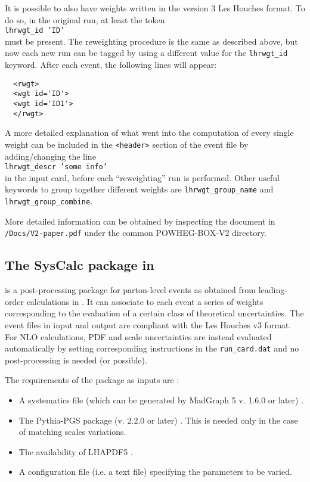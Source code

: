 \noindent It is possible to also have weights written in the version 3 Les Houches format. 
To do so, in the original run, at least the token\\
\texttt{lhrwgt\_id 'ID'}\\
\noindent must be present. The reweighting procedure is the same as described 
above, but now each new run can be tagged by using a different value 
for the \texttt{lhrwgt\_id} keyword. After each event, the following lines will 
appear: 
\small{
\begin{verbatim}
  <rwgt> 
  <wgt id='ID'>
  <wgt id='ID1'>
  </rwgt> 
\end{verbatim}}
\normalsize

A more detailed explanation of what went into the computation of every 
single weight can be included in the \texttt{<header>} section of the event 
file by adding/changing the line \\
\texttt{lhrwgt\_descr 'some info'}\\
\noindent in the input card, before each ``reweighting'' run is performed. Other 
useful keywords to group together different weights are 
\texttt{lhrwgt\_group\_name} and \texttt{lhrwgt\_group\_combine}. 

More detailed information can be obtained by inspecting the document in 
\texttt{/Docs/V2-paper.pdf} under the common \textsc{POWHEG-BOX-V2} directory. 

\subsection{The SysCalc package in \madgraph}


\syscalc is a post-processing package for parton-level events as obtained from leading-order calculations in \madgraph.  It can associate to each event a series of weights corresponding to the evaluation of a certain class of theoretical uncertainties. The event files in input and output are compliant with  the Les Houches v3 format.
For NLO calculations, PDF and scale uncertainties are instead evaluated automatically by setting corresponding instructions in the \texttt{run\_card.dat} and no post-processing is needed (or possible).

The requirements of the package as inputs are : 
\begin{itemize}
\item A systematics file (which can be generated by MadGraph 5 v. 1.6.0 or later) \cite{Alwall:2014hca,Alwall:2011uj}.
\item The Pythia-PGS package (v. 2.2.0 or later) \cite{Sjostrand:2006za}. This is needed only in the case of matching scales variations.
\item The availability of LHAPDF5 \cite{Whalley:2005nh}.
\item A configuration file (i.e. a text file) specifying the parameters to be varied. 
\end{itemize}

